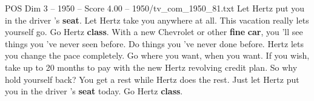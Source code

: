 \begin{textsample}{POS Dim 3 – 1950 – Score 4.00 – 1950/tv\_com\_1950\_81.txt}  \label{ex:f3_pos_014}
Let Hertz put you in the driver 's \textbf{seat}.
Let Hertz take you anywhere at all.
This vacation really lets yourself go.
Go Hertz \textbf{class}.
With a new Chevrolet or other \textbf{fine} \textbf{car}, you 'll see things you 've never seen before.
Do things you 've never done before.
Hertz lets you change the pace completely.
Go where you want, when you want.
If you wish, take up to 20 months to pay with the new Hertz revolving credit plan.
So why hold yourself back?
You get a rest while Hertz does the rest.
Just let Hertz put you in the driver 's \textbf{seat} today.
Go Hertz \textbf{class}.

\end{textsample}
